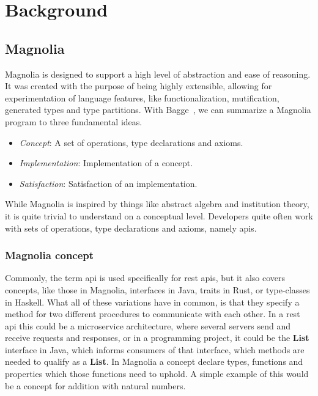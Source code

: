 \chapter{Background} \label{cha:background}

\section{Magnolia}

Magnolia is designed to support a high level of abstraction and ease of
reasoning. It was created with the purpose of being highly extensible,
allowing for experimentation of language features, like functionalization,
mutification, generated types and type partitions. With
Bagge~\cite{baggeThesis}, we can summarize a Magnolia program to three
fundamental ideas.

\begin{itemize}
  \item \textit{Concept}: A set of operations, type declarations and axioms.
  \item \textit{Implementation}: Implementation of a concept.
  \item \textit{Satisfaction}: Satisfaction of an implementation.
\end{itemize}

While Magnolia is inspired by things like abstract algebra and institution
theory, it is quite trivial to understand on a conceptual level. Developers quite
often work with sets of operations, type declarations and axioms, namely
\gls*{api}s.

\subsection{Magnolia concept}

Commonly, the term \gls*{api} is used specifically for \gls*{rest} \gls*{api}s, but
it also covers concepts, like those in Magnolia, interfaces in Java, traits in
Rust, or type-classes in Haskell. What all of these variations have in common,
is that they specify a method for two different procedures to communicate with
each other. In a \gls*{rest} \gls*{api} this could be a microservice architecture,
where several servers send and receive requests and responses, or in a
programming project, it could be the \textbf{List} interface in Java, which
informs consumers of that interface, which methods are needed to qualify as a
\textbf{List}. In Magnolia a concept declare types, functions and properties
which those functions need to uphold. A simple example of this would be a
concept for addition with natural numbers.

